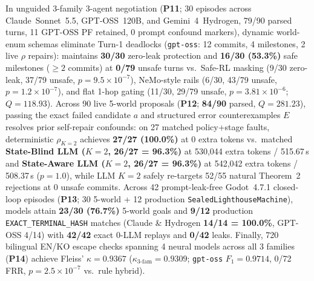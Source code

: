 In unguided 3-family 3-agent negotiation (\textbf{P11}; 30 episodes across Claude~Sonnet~5.5, GPT-OSS~120B, and Gemini~4~Hydrogen, 79/90 parsed turns, 11 GPT-OSS PF retained, 0 prompt confound markers), dynamic world-enum schemas eliminate Turn-1 deadlocks (\texttt{gpt-oss}: 12 commits, 4 milestones, 2 live $\rho$ repairs): \system{} maintains \textbf{30/30} zero-leak protection and \textbf{16/30 (53.3\%)} safe milestones (${\ge}2$ commits) at \textbf{0/79} unsafe turns vs.\ Safe-RL masking (9/30 zero-leak, 37/79 unsafe, $p{=}9.5{\times}10^{-7}$), NeMo-style rails (6/30, 43/79 unsafe, $p{=}1.2{\times}10^{-7}$), and flat 1-hop gating (11/30, 29/79 unsafe, $p{=}3.81{\times}10^{-6}$; $Q{=}118.93$). Across 90 live 5-world proposals (\textbf{P12}; \textbf{84/90} parsed, $Q{=}281.23$), passing the exact failed candidate $a$ and structured error counterexamples $E$ resolves prior self-repair confounds: on 27 matched policy+stage faults, deterministic $\rho_{K=2}$ achieves \textbf{27/27 (100.0\%)} at 0 extra tokens vs.\ matched \textbf{State-Blind LLM ($K{=}2$, 26/27 = 96.3\%)} at 530,044 extra tokens / 515.67\,s and \textbf{State-Aware LLM ($K{=}2$, 26/27 = 96.3\%)} at 542,042 extra tokens / 508.37\,s ($p{=}1.0$), while LLM $K{=}2$ safely re-targets 52/55 natural Theorem~2 rejections at 0 unsafe commits. Across 42 prompt-leak-free Godot~4.7.1 closed-loop episodes (\textbf{P13}; 30 5-world + 12 production \texttt{SealedLighthouseMachine}), models attain \textbf{23/30 (76.7\%)} 5-world goals and \textbf{9/12} production \texttt{EXACT\_TERMINAL\_HASH} matches (Claude \& Hydrogen \textbf{14/14 = 100.0\%}, GPT-OSS 4/14) with \textbf{42/42} exact 0-LLM replays and \textbf{0/42} leaks. Finally, 720 bilingual EN/KO escape checks spanning 4 neural models across all 3 families (\textbf{P14}) achieve Fleiss' $\kappa{=}\mathbf{0.9367}$ ($\kappa_{3\text{-fam}}{=}0.9309$; \texttt{gpt-oss} $F_1{=}0.9714$, 0/72 FRR, $p{=}2.5{\times}10^{-7}$ vs.\ rule hybrid).

